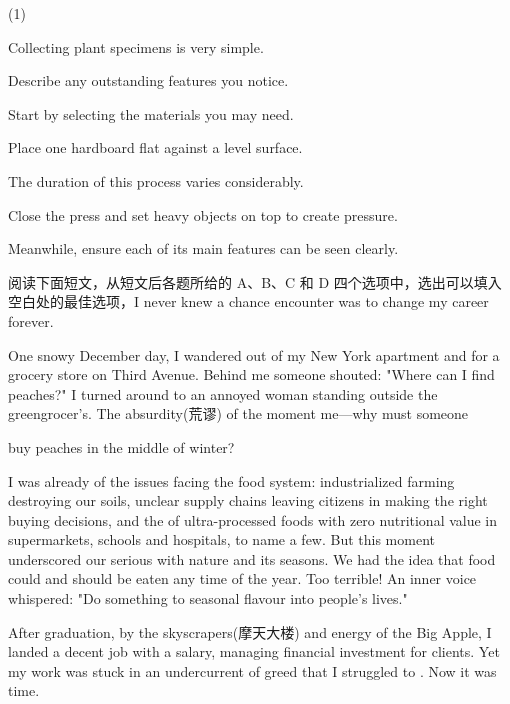 \documentclass{英语试卷}
\begin{document}
\begin{choices}(1)
  \item Collecting plant specimens is very simple.
  \item Describe any outstanding features you notice.
  \item Start by selecting the materials you may need.
  \item Place one hardboard flat against a level surface.
  \item The duration of this process varies considerably.
  \item Close the press and set heavy objects on top to create pressure.
  \item Meanwhile, ensure each of its main features can be seen clearly.
\end{choices}
\par 阅读下面短文，从短文后各题所给的 A、B、C 和 D 四个选项中，选出可以填入空白处的最佳选项，I never knew a chance encounter was to change my career forever.\par
\par One snowy December day, I wandered out of my New York apartment and  for a grocery store on Third Avenue. Behind me someone shouted: "Where can I find peaches?" I turned around to  an annoyed woman standing outside the greengrocer's. The absurdity(荒谬) of the moment  me—why must someone\par
\par buy peaches in the middle of winter?\par
\par I was already  of the issues facing the food system: industrialized farming destroying our soils, unclear supply chains leaving citizens  in making the right buying decisions, and the  of ultra-processed foods with zero nutritional value in supermarkets, schools and hospitals, to name a few. But this moment underscored our serious  with nature and its seasons. We had  the idea that food could and should be eaten any time of the year. Too terrible! An inner voice whispered: "Do something to  seasonal flavour into people's lives."\par
\par After graduation,  by the skyscrapers(摩天大楼) and energy of the Big Apple, I landed a decent job with a  salary, managing financial investment for clients. Yet my work was stuck in an undercurrent of greed that I struggled to . Now it was time.\par
\end{document}
